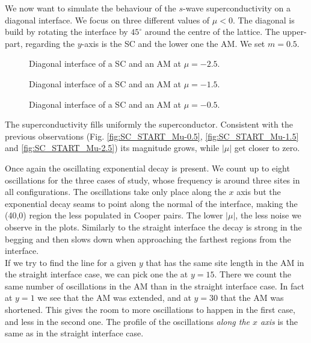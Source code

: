 \documentclass[..\main.tex]{subfile}
\begin{document}
We now want to simulate the behaviour of the $s$-wave superconductivity on a diagonal interface. We focus on three different values of $\mu<0$.  
The diagonal is build by rotating the interface by $45^{\circ}$ around the centre of the lattice. The upper-part, regarding the $y$-axis is the SC
and the lower one the AM. We set $m=0.5$.
\begin{figure}[H]
    \centering
    
    \caption{Diagonal interface of a SC and an AM at $\mu = -2.5$.}
\end{figure}
\begin{figure}[H]
    \centering
    
    \caption{Diagonal interface of a SC and an AM at $\mu = -1.5$.}
\end{figure}
\begin{figure}[H]
    \centering
    
    \caption{Diagonal interface of a SC and an AM at $\mu = -0.5$.}
\end{figure}
The superconductivity fills uniformly the superconductor. Consistent with the previous observations 
(Fig. \ref{fig:SC_START_Mu-0.5}, \ref{fig:SC_START_Mu-1.5} and \ref{fig:SC_START_Mu-2.5}) its magnitude grows, while $|\mu|$ get closer to zero.
 

Once again the oscillating exponential decay is present. We count up to eight oscillations for the three cases of study, whose
frequency is around three sites in all configurations. The oscillations take only place along the $x$ axis but the exponential decay
seams to point along the normal of the interface, making the (40,0) region the less populated in Cooper pairs.
The lower $|\mu|$, the less noise we observe in the plots. Similarly to the straight interface the decay is strong in the begging
and then slows down when approaching the farthest regions from the interface.\\

If we try to find the line for a given $y$ that has the same site length in the AM in the straight interface case, we can pick one the at $y=15$.
There we count the same number of oscillations in the AM than in the straight interface case. In fact at $y=1$ we see that the AM was
extended, and at $y=30$ that the AM was shortened. This gives the room to more oscillations to happen in the first case,
and less in the second one. The profile of the oscillations \textit{along the $x$ axis} is the same as in the straight interface case. \\
\end{document}

